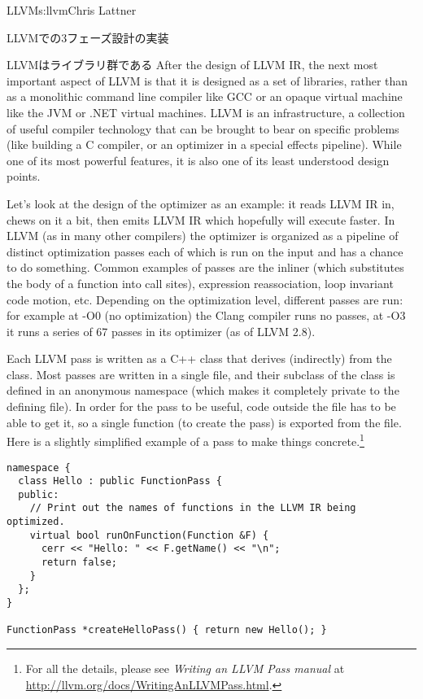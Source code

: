 \begin{aosachapter}{LLVM}{s:llvm}{Chris Lattner}
\begin{aosasect1}{LLVMでの3フェーズ設計の実装}
\begin{aosasect2}{LLVMはライブラリ群である}
After the design of LLVM IR, the next most important
aspect of LLVM is that it is designed as a set of libraries, rather than as a
monolithic command line compiler like GCC or an opaque virtual machine
like the JVM or .NET virtual machines.  LLVM is an
infrastructure, a collection of useful compiler technology that can be
brought to bear on specific problems (like building a C compiler, or
an optimizer in a special effects pipeline).  While one of its most
powerful features, it is also one of its least understood design
points.

Let's look at the design of the optimizer as an example: it reads LLVM
IR in, chews on it a bit, then emits LLVM IR which hopefully will
execute faster.  In LLVM (as in many other compilers) the optimizer is
organized as a pipeline of distinct optimization passes each of which
is run on the input and has a chance to do something.  Common examples
of passes are the inliner (which substitutes the body of a function
into call sites), expression reassociation, loop invariant code
motion, etc.  Depending on the optimization level, different passes
are run: for example at -O0 (no optimization) the Clang compiler runs
no passes, at -O3 it runs a series of 67 passes in its optimizer (as
of LLVM 2.8).

Each LLVM pass is written as a C++ class that derives (indirectly)
from the  class.  Most passes are written in a single
 file, and their subclass of the  class is
defined in an anonymous namespace (which makes it completely private
to the defining file).  In order for the pass to be useful, code
outside the file has to be able to get it, so a single function (to
create the pass) is exported from the file.  Here is a slightly
simplified example of a pass to make things concrete.\footnote{ For
all the details, please see \emph{Writing an LLVM Pass manual} at
\url{http://llvm.org/docs/WritingAnLLVMPass.html}.  }

\begin{verbatim}
namespace {
  class Hello : public FunctionPass {
  public:
    // Print out the names of functions in the LLVM IR being optimized.
    virtual bool runOnFunction(Function &F) {
      cerr << "Hello: " << F.getName() << "\n";
      return false;
    }
  };
}

FunctionPass *createHelloPass() { return new Hello(); }
\end{verbatim}


\end{aosasect2}
\end{aosasect1}
\end{aosachapter}
